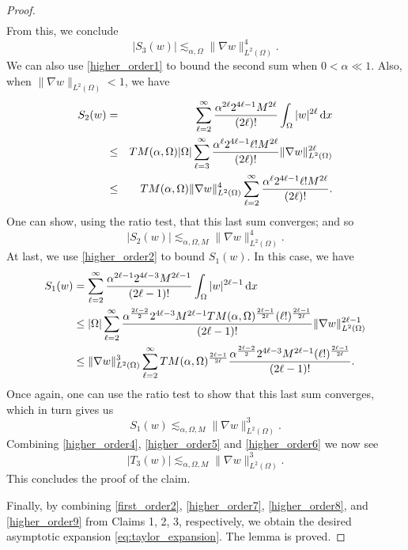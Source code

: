 \documentclass[10pt,a4paper]{amsart}
\newcommand{\ud}{\,\mathrm{d}}
\begin{document}
\begin{proof}
\begin{align*}
    \end{align*} 
    From this, we conclude
    \begin{equation} \label{higher_order4}
    |S_3(w)| \lesssim_{\alpha,\Omega} \| \nabla w \|_{L^2(\Omega)}^4.
    \end{equation}
    We can also use \eqref{higher_order1} to bound the second sum when $0<\alpha\ll1$. Also, when $\| \nabla w \|_{L^2(\Omega)} < 1$, we have  
    \begin{eqnarray*} 
    S_2(w) & = & \sum_{\ell = 2}^\infty \frac{\alpha^{2\ell} 2^{4\ell-1}M^{2\ell} }{(2\ell)!} 
    \int_\Omega |w|^{2\ell} \ud x \\  
    & \leq & {\rm TM}(\alpha,\Omega) |\Omega| \sum_{\ell=3}^\infty \frac{\alpha^\ell 2^{4\ell-1} \ell! M^{2\ell}}
    {(2\ell)!} \| \nabla w\|_{L^2(\Omega)}^{2\ell} \\  
    & \leq & {\rm TM}(\alpha,\Omega) \| \nabla w\|_{L^2(\Omega)}^4 \sum_{\ell=2}^\infty 
    \frac{\alpha^\ell 2^{4\ell-1} \ell! M^{2\ell}}{(2\ell)!}. 
    \end{eqnarray*} 
    One can show, using the ratio test, that this last sum converges; and so
    \begin{equation} \label{higher_order5} 
    |S_2(w)| \lesssim_{\alpha,\Omega,M} \| \nabla w \|_{L^2(\Omega)}^4.
    \end{equation}
    At last, we use \eqref{higher_order2} to bound $S_1(w)$. 
    In this case, we have 
    \begin{align*} 
    S_1(w) & = \sum_{\ell=2}^\infty \frac{\alpha^{2\ell-1} 2^{4\ell-3} M^{2\ell-1} }
    {(2\ell-1) !} \int_\Omega |w|^{2\ell-1} \ud x \\ 
    & \leq |\Omega| \sum_{\ell=2}^\infty \frac{\alpha^{\frac{2\ell-2}{2}} 2^{4\ell-3} 
    M^{2\ell-1} {\rm TM}(\alpha,\Omega)^{\frac{2\ell-1}{2\ell}} (\ell!)^{\frac{2\ell-1}{2\ell}}}
    {(2\ell-1)!} \| \nabla w\|_{L^2(\Omega)}^{2\ell-1} \\ 
    & \leq  \| \nabla w \|_{L^2(\Omega)}^3 \sum_{\ell=2}^\infty 
    {\rm TM}(\alpha,\Omega)^{\frac{2\ell-1}{2\ell}}\frac{\alpha^{\frac{2\ell-2}{2}} 2^{4\ell-3} M^{2\ell-1} (\ell!)^{\frac{2\ell-1}{2\ell}}}{(2\ell-1)!}. 
    \end{align*} 
    Once again, one can use the ratio test to show that this last sum converges, which in 
    turn gives us 
    \begin{equation} \label{higher_order6} 
    S_1(w) \lesssim_{\alpha,\Omega,M} \| \nabla w \|_{L^2(\Omega)}^3. 
    \end{equation} 
    Combining \eqref{higher_order4}, \eqref{higher_order5} and \eqref{higher_order6}
    we now see 
    \begin{equation} \label{higher_order7} 
    |T_3(w)| \lesssim_{\alpha, \Omega, M} \| \nabla w \|_{L^2(\Omega)}^3.
    \end{equation} 
    This concludes the proof of the claim.
    
    Finally, by combining \eqref{first_order2}, \eqref{higher_order7}, \eqref{higher_order8}, 
    and \eqref{higher_order9} from Claims 1, 2, 3, respectively, we obtain 
    the desired asymptotic expansion \eqref{eq:taylor_expansion}. 
    The lemma is proved.
\end{proof}
\end{document}
